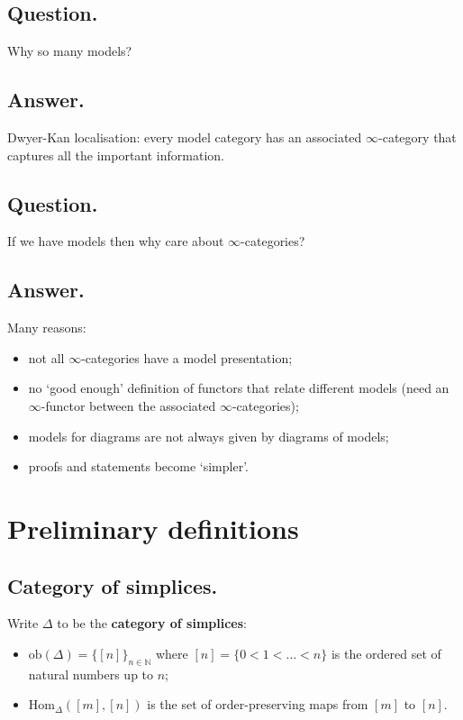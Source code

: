\documentclass{article}
\numberwithin{equation}{subsection}
\renewcommand{\ss}[1]{\subsection{#1}}
\newcommand{\Hom}{\mathrm{Hom}}
\begin{document}
        \ss{Question.}
            Why so many models?

        \ss{Answer.}
            Dwyer-Kan localisation: every model category has an associated $\infty$-category that captures all the important information.

        \ss{Question.}
            If we have models then why care about $\infty$-categories?

        \ss{Answer.}
            Many reasons:
            \begin{itemize}
                \item not all $\infty$-categories have a model presentation;
                \item no `good enough' definition of functors that relate different models (need an $\infty$-functor between the associated $\infty$-categories);
                \item models for diagrams are not always given by diagrams of models;
                \item proofs and statements become `simpler'.
            \end{itemize}

    \section{Preliminary definitions}

        \ss{Category of simplices.}
            Write $\Delta$ to be the \textbf{category of simplices}:
            \begin{itemize}
                \item $\mathrm{ob}(\Delta) = \{[n]\}_{n\in\mathbb{N}}$ where $[n]=\{0<1<\ldots<n\}$ is the ordered set of natural numbers up to $n$;
                \item $\Hom_\Delta([m],[n])$ is the set of order-preserving maps from $[m]$ to $[n]$.
            \end{itemize}
\end{document}
